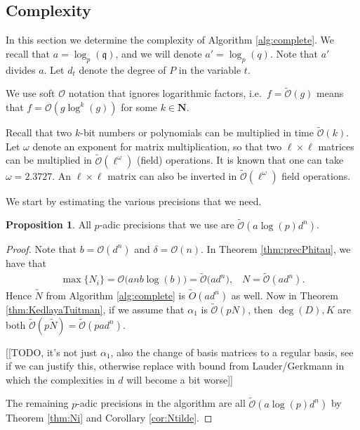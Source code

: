 \documentclass[a4paper,11pt]{article}
\numberwithin{equation}{section}
\newcommand{\NN}{\mathbf{N}} %
\theoremstyle{definition}
\newtheorem{prop}[thm]{Proposition}
\begin{document}
\subsection{Complexity}

In this section we determine the complexity of Algorithm \ref{alg:complete}. We recall that $a = \log_p(\mathfrak{q})$,
and we will denote $a' = \log_p(q)$. Note that $a'$ divides $a$. Let $d_t$ denote the degree of $P$ in the variable $t$.


We use soft $\mathcal{O}$ notation that ignores logarithmic factors, i.e.\ 
$f=\tilde{\mathcal{O}}(g)$ means that $f=\mathcal{O}(g \log^k(g))$ for some $k \in \NN$.

Recall that two $k$-bit numbers or polynomials can be multiplied in time $\tilde{\mathcal{O}}(k)$.
Let $\omega$ denote an exponent for matrix multiplication, so that two $\ell \times \ell$
matrices can be multiplied in $\tilde{\mathcal{O}}(\ell^{\omega})$ (field) operations. It
is known that one can take $\omega=2.3727$. An $\ell \times \ell$ matrix can also be inverted in 
$\tilde{\mathcal{O}}(\ell^{\omega})$ field operations.

We start by estimating the various precisions that we need. 

\begin{prop}
All $p$-adic precisions that we use are $\tilde{\mathcal{O}}(a\log(p)d^n)$.
\end{prop}

\begin{proof}
Note that $b=\mathcal{O}(d^n)$
and $\delta=\mathcal{O}(n)$. In Theorem \ref{thm:precPhitau}, we have that
\begin{eqnarray*}
\max\{N_i\} = \mathcal{O}\bigl(a nb \log(b) \bigr)=\tilde{\mathcal{O}}\bigl(a d^n \bigr), \; \; \;
N           = \tilde{\mathcal{O}}(a d^n).
\end{eqnarray*}
Hence $\tilde{N}$ from Algorithm \ref{alg:complete} 
is $\tilde{O}(ad^n)$ as well. Now in Theorem \ref{thm:KedlayaTuitman}, if 
we assume that $\alpha_1$ is $\tilde{\mathcal{O}}(pN)$, then $\deg(D), K$ are 
both $\tilde{\mathcal{O}}(p\tilde{N}) = \tilde{\mathcal{O}}(pad^n)$.

[[TODO, it's not just $\alpha_1$, also the change of basis matrices to a regular basis, see if we 
can justify this, otherwise replace with bound from Lauder/Gerkmann in which the complexities in $d$ 
will become a bit worse]]

The remaining $p$-adic precisions 
in the algorithm are all $\tilde{\mathcal{O}}(a\log(p)d^n)$ by Theorem \ref{thm:Ni} and Corollary 
\ref{cor:Ntilde}.
\end{proof} 
\end{document}
